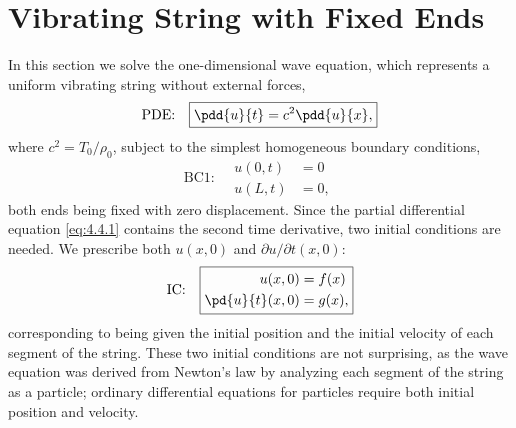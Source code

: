 \section{Vibrating String with Fixed Ends}
\label{sec:vibrating-string-fixed}

In this section we solve the one-dimensional wave equation, which represents a uniform vibrating string without external forces,
\begin{equation}
\text{PDE:}\quad \boxed{\pdd{u}{t} = c^2\pdd{u}{x},}
\label{eq:4.4.1}
\end{equation}
where $c^2 = T_0/\rho_0$, subject to the simplest homogeneous boundary conditions,
\begin{equation}
\text{BC1:}\quad \boxed{\begin{aligned} u(0,t) &= 0 \\ u(L,t) &= 0, \end{aligned}}
\label{eq:4.4.2}
\end{equation}
both ends being fixed with zero displacement.  Since the partial differential equation \eqref{eq:4.4.1} contains the second time derivative, two initial conditions are needed.  We prescribe both $u(x,0)$ and $\partial u/\partial t(x,0)$:
\begin{equation}
\text{IC:}\quad \boxed{\begin{aligned} u(x,0) &= f(x) \\ \pd{u}{t}(x,0) &= g(x), \end{aligned}}
\label{eq:4.4.3}
\end{equation}
corresponding to being given the initial position and the initial velocity of each segment of the string.  These two initial conditions are not surprising, as the wave equation was derived from Newton's law by analyzing each segment of the string as a particle; ordinary differential equations for particles require both initial position and velocity.


